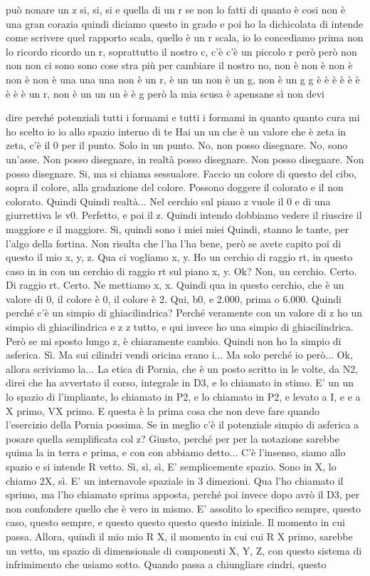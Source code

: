 \begin{soluzione}
{può nonare un z si, si, si e quella di un r se non lo fatti di quanto è cosi non è una gran corazia quindi diciamo questo in grado e poi ho la dichicolata di intende come scrivere quel rapporto scala, quello è un r scala, io lo concediamo prima non lo ricordo ricordo un r, soprattutto il nostro c, c'è c'è un piccolo r però però non non non ci sono sono cose stra più per cambiare il nostro no, non è non è non è non è non è una una una non è un r, è un un non è un g, non è un g g è è è è è è è è è un r, non è un un un è è g però la mia scusa è apensane sì non devi 
   
   dire perché potenziali tutti i formami e tutti i formami in quanto quanto cura mi ho scelto io io allo spazio interno di te Hai un un che è un valore che è zeta in zeta, c'è il 0 per il punto. Solo in un punto. No, non posso disegnare. No, sono un'asse. Non posso disegnare, in realtà posso disegnare. Non posso disegnare. Non posso disegnare. Si, ma si chiama sessualore. Faccio un colore di questo del cibo, sopra il colore, alla gradazione del colore. Possono doggere il colorato e il non colorato. Quindi Quindi realtà... Nel cerchio sul piano z vuole il 0 e di una giurrettiva le v0. Perfetto, e poi il z. Quindi intendo dobbiamo vedere il riuscire il maggiore e il maggiore. Si, quindi sono i miei miei Quindi, stanno le tante, per l'algo della fortina. Non risulta che l'ha l'ha bene, però se avete capito poi di questo il mio x, y, z. Qua ci vogliamo x, y. Ho un cerchio di raggio rt, in questo caso in in con un cerchio di raggio rt sul piano x, y. Ok? Non, un cerchio. Certo. Di raggio rt. Certo. Ne mettiamo x, x. Quindi qua in questo cerchio, che è un valore di 0, il colore è 0, il colore è 2. Qui, b0, e 2.000, prima o 6.000. Quindi perché c'è un simpio di ghiacilindrica? Perché veramente con un valore di z ho un simpio di ghiacilindrica e z z tutto, e qui invece ho una simpio di ghiacilindrica. Però se mi sposto lungo z, è chiaramente cambio. Quindi non ho la simpio di asferica. Sì. Ma sui cilindri vendi oricina erano i... Ma solo perché io però... Ok, allora scriviamo la... La etica di Pornia, che è un posto scritto in le volte, da N2, direi che ha avvertato il corso, integrale in D3, e lo chiamato in stimo. E' un un lo spazio di l'impliante, lo chiamato in P2, e lo chiamato in P2, e levato a I, e e a X primo, VX primo. E questa è la prima cosa che non deve fare quando l'esercizio della Pornia possima. Se in meglio c'è il potenziale simpio di asferica a posare quella semplificata col z? Giusto, perché per per la notazione sarebbe quima la in terra e prima, e con con abbiamo detto... C'è l'insenso, siamo allo spazio e si intende R vetto. Sì, sì, sì, E' semplicemente spazio. Sono in X, lo chiamo 2X, sì. E' un internavole spaziale in 3 dimezioni. Qua l'ho chiamato il sprimo, ma l'ho chiamato sprima apposta, perché poi invece dopo avrò il D3, per non confondere quello che è vero in mismo. E' assolito lo specifico sempre, questo caso, questo sempre, e questo questo questo questo iniziale. Il momento in cui passa. Allora, quindi il mio mio R X, il momento in cui cui R X primo, sarebbe un vetto, un spazio di dimensionale di componenti X, Y, Z, con questo sistema di infrimimento che usiamo sotto. Quando passa a chiungliare cindri, questo }
\end{soluzione}
